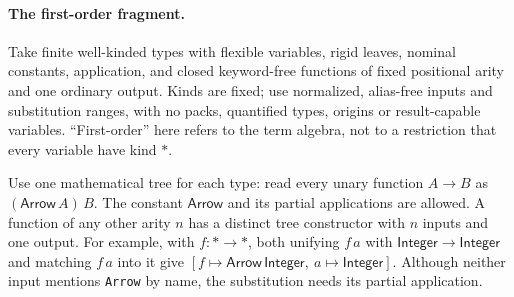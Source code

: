 \documentclass[11pt]{article}
\theoremstyle{definition}
\newcommand{\code}[1]{\texttt{#1}}
\newcommand{\Int}{\mathsf{Integer}}
\newcommand{\arr}{\mathbin{\to}}
\begin{document}
\paragraph{The first-order fragment.}
Take finite well-kinded types with flexible variables, rigid leaves,
nominal constants, application, and closed keyword-free functions of fixed
positional arity and one ordinary output. Kinds are fixed; use normalized,
alias-free inputs and substitution ranges, with no packs, quantified types,
origins or result-capable variables. ``First-order'' here refers to the
term algebra, not to a restriction that every variable have kind $*$.

Use one mathematical tree for each type: read every unary function
$A\arr B$ as $(\mathsf{Arrow}\,A)\,B$. The constant $\mathsf{Arrow}$ and
its partial applications are allowed. A function of any other arity $n$
has a distinct tree constructor with $n$ inputs and one output.
For example, with $f:*\arr *$, both unifying $f\,a$ with
$\Int\arr\Int$ and matching $f\,a$ into it give
$[f\mapsto\mathsf{Arrow}\,\Int,\ a\mapsto\Int]$. Although neither input
mentions \code{Arrow} by name, the substitution needs its partial application.
\end{document}
